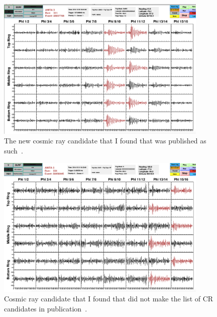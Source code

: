 

\begin{figure}
\centering
\includegraphics[width=0.9\textwidth]{figures/48837708.png}
\caption{The new cosmic ray candidate that I found that was published as such~\cite{diffuse}.}
\label{new_cr}
\end{figure}


\begin{figure}
\centering
\includegraphics[width=0.9\textwidth]{figures/56038445.png}
\caption{Cosmic ray candidate that I found that did not make the list of CR candidates in publication~\cite{diffuse}.}
\label{cr_but_reject}
\end{figure}


